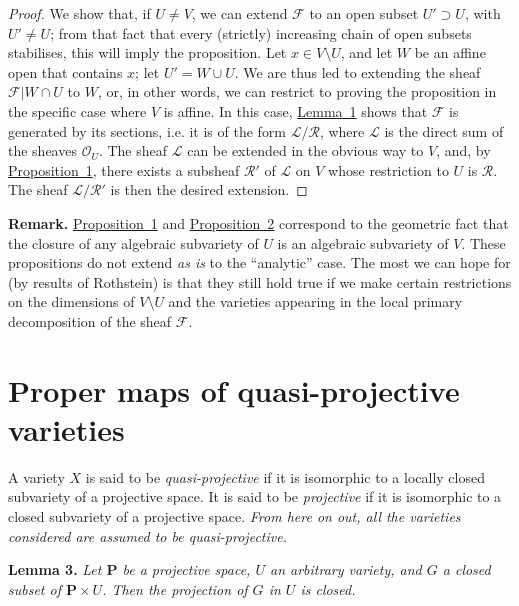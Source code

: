 \documentclass{article}
\newenvironment{itenv}[1]
  {\phantomsection\par\medskip\noindent\textbf{#1.}\itshape}
  {\par\medskip}
\newenvironment{rmenv}[1]
  {\phantomsection\par\medskip\noindent\textbf{#1.}\rmfamily}
  {\par\medskip}
\newcommand{\scr}[1]{{\mathscr{#1}}}
\newcommand{\PP}{\mathbf{P}}
\begin{document}
\begin{proof}
  We show that, if $U\neq V$, we can extend $\scr{F}$ to an open subset $U'\supset U$, with $U'\neq U$;
  from that fact that every (strictly) increasing chain of open subsets stabilises, this will imply the proposition.
  Let $x\in V\setminus U$, and let $W$ be an affine open that contains $x$;
  let $U'=W\cup U$.
  We are thus led to extending the sheaf $\scr{F}|W\cap U$ to $W$, or, in other words, we can restrict to proving the proposition in the specific case where $V$ is affine.
  In this case, \hyperref[lemma1]{Lemma~1} shows that $\scr{F}$ is generated by its sections, i.e. it is of the form $\scr{L}/\scr{R}$, where $\scr{L}$ is the direct sum of the sheaves $\scr{O}_U$.
  The sheaf $\scr{L}$ can be extended in the obvious way to $V$, and, by \hyperref[proposition1]{Proposition~1}, there exists a subsheaf $\scr{R}'$ of $\scr{L}$ on $V$ whose restriction to $U$ is $\scr{R}$.
  The sheaf $\scr{L}/\scr{R}'$ is then the desired extension.
\end{proof}

\begin{rmenv}{Remark}
  \hyperref[proposition1]{Proposition~1} and \hyperref[proposition2]{Proposition~2} correspond to the geometric fact that the closure of any algebraic subvariety of $U$ is an algebraic subvariety of $V$.
  These propositions do not extend \emph{as is} to the ``analytic'' case.
  The most we can hope for (by results of Rothstein) is that they still hold true if we make certain restrictions on the dimensions of $V\setminus U$ and the varieties appearing in the local primary decomposition of the sheaf $\scr{F}$.
\end{rmenv}


\section{Proper maps of quasi-projective varieties}
\label{section2}

A variety $X$ is said to be \emph{quasi-projective} if it is isomorphic to a locally closed subvariety of a projective space.
It is said to be \emph{projective} if it is isomorphic to a closed subvariety of a projective space.
\emph{From here on out, all the varieties considered are assumed to be quasi-projective.}

\begin{itenv}{Lemma 3}
\label{lemma3}
  Let $\PP$ be a projective space, $U$ an arbitrary variety, and $G$ a closed subset of $\PP\times U$.
  Then the projection of $G$ in $U$ is closed.
\end{itenv}
\end{document}
